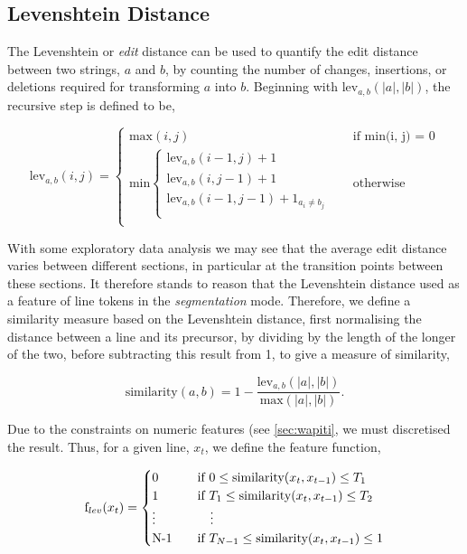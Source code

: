 \subsection{Levenshtein Distance}

The Levenshtein or \emph{edit} distance can be used to quantify the edit distance between two strings, $a$ and $b$, by counting the number of changes, insertions, or deletions required for transforming $a$ into $b$. Beginning with $\text{lev}_{a, b}(|a|, |b|)$, the recursive step is defined to be,

\begin{equation}
  \text{lev}_{a, b}(i, j) = 
  \begin{cases} 
  	\text{max}(i, j) &\quad\text{if min(i, j) = 0} \\
	\text{min}
		\begin{cases}
			\text{lev}_{a, b}(i - 1, j) + 1 \\
			\text{lev}_{a, b}(i, j - 1) + 1 \\
			\text{lev}_{a, b}(i - 1, j - 1) + 1_{a_i \neq b_j} \\
		\end{cases} &\quad\text{otherwise} \\
  \end{cases}
\label{eq:levenshtein}
\end{equation}

With some exploratory data analysis we may see that the average edit distance varies between different sections, in particular at the transition points between these sections. It therefore stands to reason that the Levenshtein distance used as a feature of line tokens in the \emph{segmentation} mode. Therefore, we define a similarity measure based on the Levenshtein distance, first normalising the distance between a line and its precursor, by dividing by the length of the longer of the two, before subtracting this result from 1, to give a measure of similarity,

\begin{equation}
\text{similarity}(a, b) = 1 - \frac{\text{lev}_{a, b}(|a|, |b|)}{\text{max}(|a|, |b|)}.
\label{eq:levenshteinsimilarity}
\end{equation}

Due to the constraints on numeric features (see \ref{sec:wapiti}, we must discretised the result. Thus, for a given line, $x_t$, we define the feature function, 

\begin{equation}
  \text{f}_{lev}(x_t) =
  \begin{cases}
  	0 & \quad \text{if } 0 \leq \text{similarity}(x_t, x_{t-1}) \leq T_1 \\
	1 & \quad \text{if } T_1 \leq \text{similarity}(x_t, x_{t-1}) \leq T_2\\
	\vdots & \qquad \vdots \\
	$N-1$ & \quad \text{if } T_{N-1} \leq \text{similarity}(x_t, x_{t-1}) \leq 1 \\
  \end{cases}
\label{eq:levenshteinfunction}
\end{equation}

